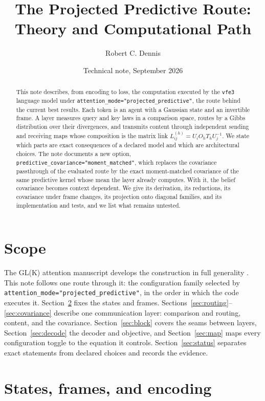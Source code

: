 \documentclass[11pt]{article}
\title{The Projected Predictive Route:\\ Theory and Computational Path}
\author{Robert C. Dennis}
\date{Technical note, September 2026}
\theoremstyle{definition}
\theoremstyle{remark}
\newcommand{\cfg}[1]{\texttt{#1}}
\begin{document}
\maketitle

\begin{abstract}
This note describes, from encoding to loss, the computation executed by the \cfg{vfe3} language model under \cfg{attention\_mode="projected\_predictive"}, the route behind the current best results. Each token is an agent with a Gaussian state and an invertible frame. A layer measures query and key laws in a comparison space, routes by a Gibbs distribution over their divergences, and transmits content through independent sending and receiving maps whose composition is the matrix link $L_{ij}^{(h)}=U_iO_hT_hU_j^{-1}$. We state which parts are exact consequences of a declared model and which are architectural choices. The note documents a new option, \cfg{predictive\_covariance="moment\_matched"}, which replaces the covariance passthrough of the evaluated route by the exact moment-matched covariance of the same predictive kernel whose mean the layer already computes. With it, the belief covariance becomes context dependent. We give its derivation, its reductions, its covariance under frame changes, its projection onto diagonal families, and its implementation and tests, and we list what remains untested.
\end{abstract}

\section{Scope}

The GL(K) attention manuscript develops the construction in full generality \citep{dennis2026glk}. This note follows one route through it: the configuration family selected by \cfg{attention\_mode="projected\_predictive"}, in the order in which the code executes it. Section~\ref{sec:states} fixes the states and frames. Sections~\ref{sec:routing}--\ref{sec:covariance} describe one communication layer: comparison and routing, content, and the covariance. Section~\ref{sec:block} covers the seams between layers, Section~\ref{sec:decode} the decoder and objective, and Section~\ref{sec:map} maps every configuration toggle to the equation it controls. Section~\ref{sec:status} separates exact statements from declared choices and records the evidence.

\section{States, frames, and encoding}
\label{sec:states}
\end{document}

